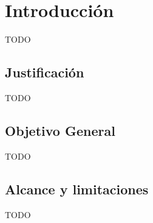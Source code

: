 \section{Introducción}
TODO
\subsection{Justificación}
TODO
\subsection{Objetivo General}

TODO

\subsection{Alcance y limitaciones}

TODO
